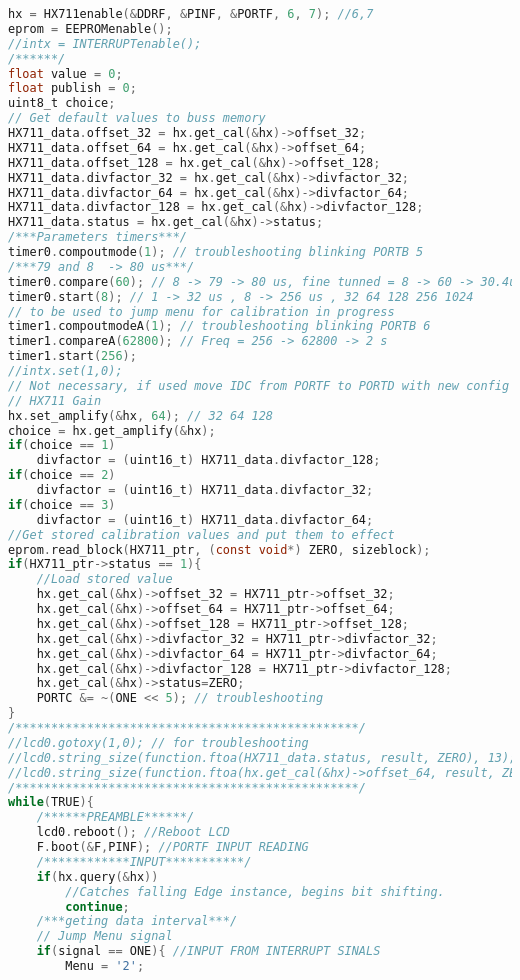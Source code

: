 \begin{lstlisting}[language=C, caption={main.c}, label=main-c, captionpos=b]
hx = HX711enable(&DDRF, &PINF, &PORTF, 6, 7); //6,7
eprom = EEPROMenable();
//intx = INTERRUPTenable();
/******/
float value = 0;
float publish = 0;
uint8_t choice;
// Get default values to buss memory
HX711_data.offset_32 = hx.get_cal(&hx)->offset_32;
HX711_data.offset_64 = hx.get_cal(&hx)->offset_64;
HX711_data.offset_128 = hx.get_cal(&hx)->offset_128;
HX711_data.divfactor_32 = hx.get_cal(&hx)->divfactor_32;
HX711_data.divfactor_64 = hx.get_cal(&hx)->divfactor_64;
HX711_data.divfactor_128 = hx.get_cal(&hx)->divfactor_128;
HX711_data.status = hx.get_cal(&hx)->status;
/***Parameters timers***/
timer0.compoutmode(1); // troubleshooting blinking PORTB 5
/***79 and 8  -> 80 us***/
timer0.compare(60); // 8 -> 79 -> 80 us, fine tunned = 8 -> 60 -> 30.4us
timer0.start(8); // 1 -> 32 us , 8 -> 256 us , 32 64 128 256 1024
// to be used to jump menu for calibration in progress
timer1.compoutmodeA(1); // troubleshooting blinking PORTB 6
timer1.compareA(62800); // Freq = 256 -> 62800 -> 2 s
timer1.start(256);
//intx.set(1,0);
// Not necessary, if used move IDC from PORTF to PORTD with new config pinage.
// HX711 Gain
hx.set_amplify(&hx, 64); // 32 64 128
choice = hx.get_amplify(&hx);
if(choice == 1)
	divfactor = (uint16_t) HX711_data.divfactor_128;
if(choice == 2)
	divfactor = (uint16_t) HX711_data.divfactor_32;
if(choice == 3)
	divfactor = (uint16_t) HX711_data.divfactor_64;
//Get stored calibration values and put them to effect
eprom.read_block(HX711_ptr, (const void*) ZERO, sizeblock);
if(HX711_ptr->status == 1){
	//Load stored value 
	hx.get_cal(&hx)->offset_32 = HX711_ptr->offset_32;
	hx.get_cal(&hx)->offset_64 = HX711_ptr->offset_64;
	hx.get_cal(&hx)->offset_128 = HX711_ptr->offset_128;
	hx.get_cal(&hx)->divfactor_32 = HX711_ptr->divfactor_32;
	hx.get_cal(&hx)->divfactor_64 = HX711_ptr->divfactor_64;
	hx.get_cal(&hx)->divfactor_128 = HX711_ptr->divfactor_128;
	hx.get_cal(&hx)->status=ZERO;
	PORTC &= ~(ONE << 5); // troubleshooting
}
/************************************************/
//lcd0.gotoxy(1,0); // for troubleshooting
//lcd0.string_size(function.ftoa(HX711_data.status, result, ZERO), 13);
//lcd0.string_size(function.ftoa(hx.get_cal(&hx)->offset_64, result, ZERO), 13);
/************************************************/
while(TRUE){
	/******PREAMBLE******/
	lcd0.reboot(); //Reboot LCD
	F.boot(&F,PINF); //PORTF INPUT READING
	/************INPUT***********/
	if(hx.query(&hx)) 
		//Catches falling Edge instance, begins bit shifting.
		continue;
	/***geting data interval***/
	// Jump Menu signal
	if(signal == ONE){ //INPUT FROM INTERRUPT SINALS
		Menu = '2';

\end{lstlisting}

